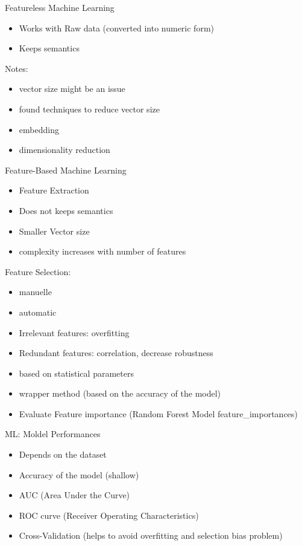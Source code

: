 \begin{frame}{Featureless Machine Learning}
\begin{itemize}
  \item Works with Raw data (converted into numeric form)
  \item Keeps semantics
\end{itemize}

Notes:
\begin{itemize}
  \item vector size might be an issue
  \item found techniques to reduce vector size
  \item embedding
  \item dimensionality reduction
\end{itemize}

\end{frame}

\begin{frame}{Feature-Based Machine Learning}
  \begin{itemize}
    \item Feature Extraction
    \item Does not keeps semantics
    \item Smaller Vector size
    \item complexity increases with number of features
  \end{itemize}
  
  Feature Selection:
  \begin{itemize}
    \item manuelle
    \item automatic
    \item Irrelevant features: overfitting
    \item Redundant features: correlation, decrease robustness
    \item based on statistical parameters
    \item wrapper method (based on the accuracy of the model)
    \item Evaluate Feature importance (Random Forest Model feature\_importances)
  \end{itemize}
\end{frame}



\begin{frame}{ML: Moldel Performances}
  \begin{itemize}
    \item Depends on the dataset
    \item Accuracy of the model (shallow)
    \item AUC (Area Under the Curve)
    \item ROC curve (Receiver Operating Characteristics)
    \item Cross-Validation (helps to avoid overfitting and selection bias problem)
  \end{itemize}
\end{frame}



